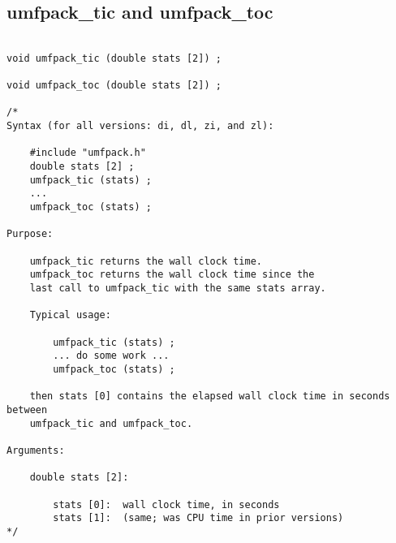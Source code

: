 \documentclass[11pt]{article}
\begin{document}
\newpage
\subsection{umfpack\_tic and umfpack\_toc}

{\footnotesize
\begin{verbatim}

void umfpack_tic (double stats [2]) ;

void umfpack_toc (double stats [2]) ;

/*
Syntax (for all versions: di, dl, zi, and zl):

    #include "umfpack.h"
    double stats [2] ;
    umfpack_tic (stats) ;
    ...
    umfpack_toc (stats) ;

Purpose:

    umfpack_tic returns the wall clock time.
    umfpack_toc returns the wall clock time since the
    last call to umfpack_tic with the same stats array.

    Typical usage:

        umfpack_tic (stats) ;
        ... do some work ...
        umfpack_toc (stats) ;

    then stats [0] contains the elapsed wall clock time in seconds between
    umfpack_tic and umfpack_toc.

Arguments:

    double stats [2]:

        stats [0]:  wall clock time, in seconds
        stats [1]:  (same; was CPU time in prior versions)
*/

\end{verbatim}
}


\newpage



\end{document}

